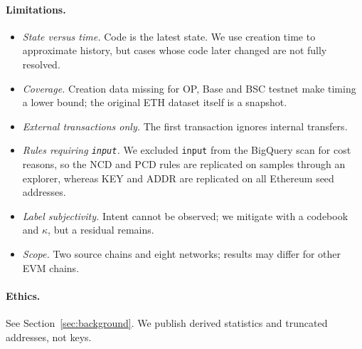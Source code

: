 \documentclass[runningheads]{llncs}
\begin{document}
\paragraph{Limitations.}
\begin{itemize}
\item \emph{State versus time.} Code is the latest state. We use creation time to
approximate history, but cases whose code later changed are not fully resolved.
\item \emph{Coverage.} Creation data missing for OP, Base and BSC testnet make
timing a lower bound; the original ETH dataset itself is a snapshot.
\item \emph{External transactions only.} The first transaction ignores internal
transfers.
\item \emph{Rules requiring \texttt{input}.} We excluded \texttt{input} from the
BigQuery scan for cost reasons, so the NCD and PCD rules are replicated on
samples through an explorer, whereas KEY and ADDR are replicated on all
Ethereum seed addresses.
\item \emph{Label subjectivity.} Intent cannot be observed; we mitigate with a
codebook and $\kappa$, but a residual remains.
\item \emph{Scope.} Two source chains and eight networks; results may differ for
other EVM chains.
\end{itemize}

\paragraph{Ethics.} See Section~\ref{sec:background}. We publish derived
statistics and truncated addresses, not keys.

\end{document}
